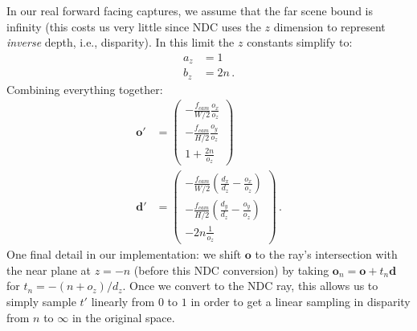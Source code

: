 In our real forward facing captures, we assume that the far scene bound is infinity (this costs us very little since NDC uses the $z$ dimension to represent \emph{inverse} depth, i.e., disparity). In this limit the $z$ constants simplify to:
\begin{align}
    a_z &= 1 \\
    b_z &= 2n \, .
\end{align}
Combining everything together:
\begin{align}
    \mathbf o' &= 
    \begin{pmatrix}
        -\frac{f_{cam}}{W/2} \frac{o_x}{o_z} \\[6pt]
        -\frac{f_{cam}}{H/2} \frac{o_y}{o_z} \\[6pt]
        1 + \frac{2n}{o_z}
    \end{pmatrix}
    \\[6pt]
    \mathbf d' &= 
    \begin{pmatrix}
        -\frac{f_{cam}}{W/2} \left(\frac{d_x}{d_z} - \frac{o_x}{o_z}\right) \\[6pt]
        -\frac{f_{cam}}{H/2} \left(\frac{d_y}{d_z} - \frac{o_y}{o_z}\right) \\[6pt]
        -2n \frac{1}{o_z}
    \end{pmatrix} \, .
\end{align}
One final detail in our implementation: we shift $\mathbf o$ to the ray's intersection with the near plane at $z=-n$ (before this NDC conversion) by taking $\mathbf o_n = \mathbf o + t_n \mathbf d$ for $t_n = -(n + o_z) / d_z$. Once we convert to the NDC ray, this allows us to simply sample $t'$ linearly from $0$ to $1$ in order to get a linear sampling in disparity from $n$ to $\infty$ in the original space.
